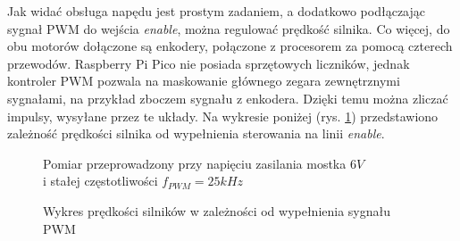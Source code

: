         Jak widać obsługa napędu jest prostym zadaniem, a dodatkowo podłączając sygnał PWM do wejścia \textit{enable}, można regulować prędkość silnika.
        Co więcej, do obu motorów dołączone są enkodery, połączone z procesorem za pomocą czterech przewodów.
        Raspberry Pi Pico nie posiada sprzętowych liczników, jednak kontroler PWM pozwala na maskowanie głównego zegara zewnętrznymi sygnałami, na przykład zboczem sygnału z enkodera.
        Dzięki temu można zliczać impulsy, wysyłane przez te układy.
        Na wykresie poniżej (rys. \ref{plot:speed_in_duty}) przedstawiono zależność prędkości silnika od wypełnienia sterowania na linii \textit{enable}.

        \begin{figure}[!ht]
            \centering
            \caption{Wykres prędkości silników w zależności od wypełnienia sygnału PWM}
            \label{plot:speed_in_duty}
            Pomiar przeprowadzony przy napięciu zasilania mostka $6V$ \\
            i stałej częstotliwości $f_{PWM} = 25kHz$
        \end{figure}


